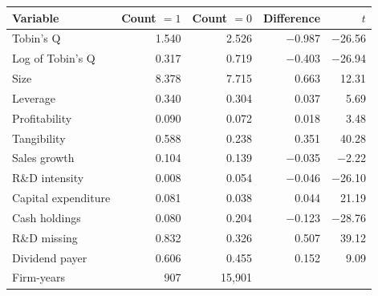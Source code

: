 \begin{tabular}{lrrrr}
\toprule
Variable & Count $=1$ & Count $=0$ & Difference & $t$ \\
\midrule
Tobin's Q & 1.540 & 2.526 & $-$0.987 & $-$26.56 \\
Log of Tobin's Q & 0.317 & 0.719 & $-$0.403 & $-$26.94 \\
Size & 8.378 & 7.715 & 0.663 & 12.31 \\
Leverage & 0.340 & 0.304 & 0.037 & 5.69 \\
Profitability & 0.090 & 0.072 & 0.018 & 3.48 \\
Tangibility & 0.588 & 0.238 & 0.351 & 40.28 \\
Sales growth & 0.104 & 0.139 & $-$0.035 & $-$2.22 \\
R\&D intensity & 0.008 & 0.054 & $-$0.046 & $-$26.10 \\
Capital expenditure & 0.081 & 0.038 & 0.044 & 21.19 \\
Cash holdings & 0.080 & 0.204 & $-$0.123 & $-$28.76 \\
R\&D missing & 0.832 & 0.326 & 0.507 & 39.12 \\
Dividend payer & 0.606 & 0.455 & 0.152 & 9.09 \\
\midrule
Firm-years & 907 & 15,901 & & \\
\bottomrule
\end{tabular}
